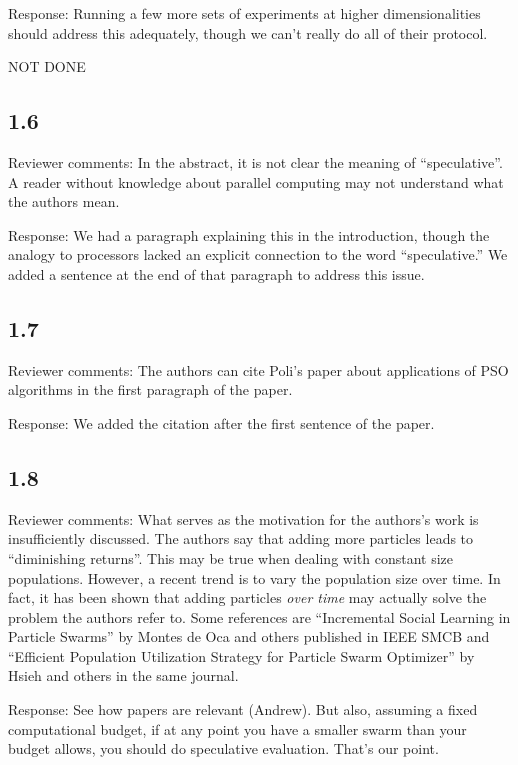\documentclass[onecolumn, 12pt]{article}
\begin{document}
Response: Running a few more sets of experiments at higher dimensionalities
should address this adequately, though we can't really do all of their
protocol.

NOT DONE

\subsection*{1.6}

Reviewer comments: In the abstract, it is not clear the meaning of
``speculative''. A reader without knowledge about parallel computing may not
understand what the authors mean.

Response: We had a paragraph explaining this in the introduction, though the
analogy to processors lacked an explicit connection to the word
``speculative.''  We added a sentence at the end of that paragraph to address
this issue.

\subsection*{1.7}

Reviewer comments: The authors can cite Poli's paper about applications of PSO
algorithms in the first paragraph of the paper.

Response: We added the citation after the first sentence of the paper.

\subsection*{1.8}

Reviewer comments: What serves as the motivation for the authors's work is
insufficiently discussed.  The authors say that adding more particles leads to
``diminishing returns''. This may be true when dealing with constant size
populations.  However, a recent trend is to vary the population size over time.
In fact, it has been shown that adding particles \emph{over time} may actually
solve the problem the authors refer to. Some references are ``Incremental
Social Learning in Particle Swarms'' by Montes de Oca and others published in
IEEE SMCB and ``Efficient Population Utilization Strategy for Particle Swarm
Optimizer'' by Hsieh and others in the same journal.

Response: See how papers are relevant (Andrew).  But also, assuming a fixed
computational budget, if at any point you have a smaller swarm than your budget
allows, you should do speculative evaluation.  That's our point.
\end{document}
